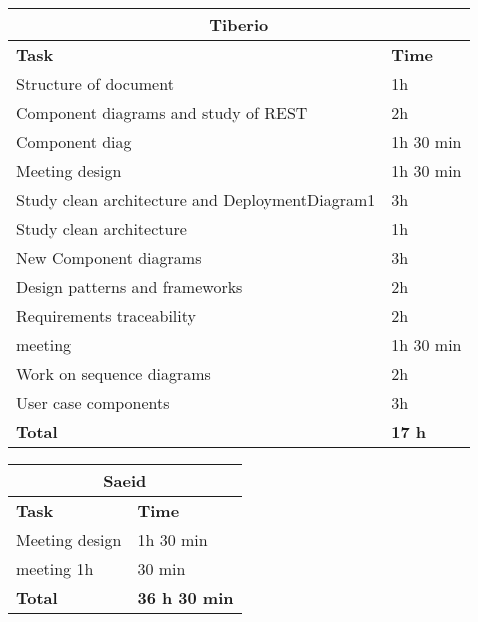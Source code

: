 \begin{table}[H]
\begin{tabular}{|l|l|}
\hline
\multicolumn{2}{|c|}{\textbf{Tiberio}}            \\ \hline
\textbf{Task}                   & \textbf{Time} \\ \hline
Structure of document                & 1h      \\ \hline
Component diagrams and study of REST       & 2h      \\ \hline
Component diag & 1h 30 min \\ \hline
Meeting design & 1h 30 min \\ \hline
Study clean architecture and DeploymentDiagram1 & 3h \\ \hline
Study clean architecture & 1h \\ \hline
New Component diagrams & 3h \\ \hline
Design patterns and frameworks & 2h \\ \hline
Requirements traceability & 2h \\ \hline
meeting & 1h 30 min \\ \hline
Work on sequence diagrams & 2h \\ \hline
User case components & 3h \\ \hline

\rowcolor {polilight}
\textbf{Total}                  & \textbf{17 h}   \\ \hline
\end{tabular}
\end{table}


\begin{table}[H]
\begin{tabular}{|l|l|}
\hline
\multicolumn{2}{|c|}{\textbf{Saeid}}            \\ \hline
\textbf{Task}                   & \textbf{Time} \\ \hline
Meeting design & 1h 30 min \\ \hline
meeting 1h & 30 min \\ \hline
\rowcolor {polilight}
\textbf{Total}                  & \textbf{36 h 30 min}   \\ \hline
\end{tabular}
\end{table}

